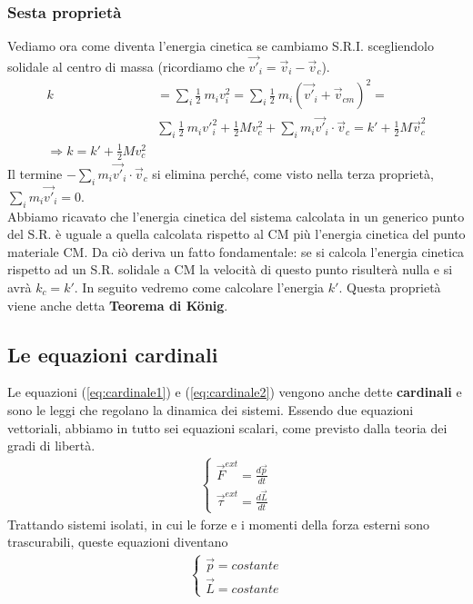 \documentclass[10pt,a4paper]{article}
\begin{document}
\subsubsection{Sesta proprietà}
Vediamo ora come diventa l'energia cinetica se cambiamo S.R.I. scegliendolo solidale al centro di massa (ricordiamo che $ \vec{v'}_i= \vec{v}_i-\vec{v}_c$).
\begin{align}\label{eq:sestaproprietà}
k &= \sum_i \frac{1}{2}\ m_i {v}^{ 2}_i= \sum_i  \frac{1}{2}\ m_i (\vec{v'}_i+\vec{v}_{cm})^{2} =\\ \nonumber
& \sum_i \frac{1}{2}\ m_i {v'}_i^2 + \frac{1}{2} M v_{c}^2 + \sum_i m_i \vec{v'}_i \cdot \vec{v}_c = k' + \frac{1}{2} M \vec{v}^{2}_c\\ \nonumber
\Rightarrow k = k' + \frac{1}{2}M v_c^2
\end{align}
Il termine $- \sum_i m_i \vec{v'}_i \cdot \vec{v}_c$ si elimina perché, come visto nella terza proprietà, $ \sum_i m_i \vec{v'}_i = 0$.\\
Abbiamo ricavato che l'energia cinetica del sistema calcolata in un generico punto del S.R. è uguale a quella calcolata rispetto al CM più l'energia cinetica del punto materiale CM. Da ciò deriva un fatto fondamentale: se si calcola l'energia cinetica rispetto ad un S.R. solidale a CM la velocità di questo punto risulterà nulla e si avrà $k_c= k'$. In seguito vedremo come calcolare l'energia $k'$. Questa proprietà viene anche detta \textbf{Teorema di K\"{o}nig}.

\subsection{Le equazioni cardinali}
Le equazioni (\ref{eq:cardinale1}) e (\ref{eq:cardinale2}) vengono anche dette \textbf{cardinali} e sono le leggi che regolano la dinamica dei sistemi. Essendo due equazioni vettoriali, abbiamo in tutto sei equazioni scalari, come previsto dalla teoria dei gradi di libertà.
\begin{align*}
\begin{cases}
	\vec{F}^{ext} = {\frac{d\vec{p}}{dt}}\\
	\vec{\tau}^{ext} =\frac{d\vec{L}}{dt}
\end{cases}
\end{align*}
Trattando sistemi isolati, in cui le forze e i momenti della forza esterni sono trascurabili, queste equazioni diventano
\begin{align*}
	\begin{cases}
	\vec{p} = costante\\
	\vec{L} = costante
	\end{cases}
\end{align*}
\end{document}

